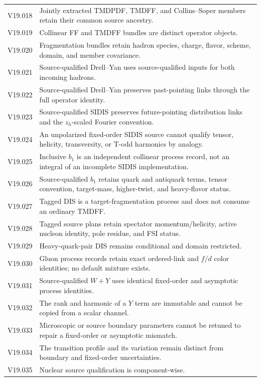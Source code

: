 \documentclass[11pt]{article}
\begin{document}
\begin{longtable}{L{0.12\textwidth}L{0.80\textwidth}}
V19.018 & Jointly extracted TMDPDF, TMDFF, and Collins--Soper members retain their common source ancestry.\\
V19.019 & Collinear FF and TMDFF bundles are distinct operator objects.\\
V19.020 & Fragmentation bundles retain hadron species, charge, flavor, scheme, domain, and member covariance.\\
V19.021 & Source-qualified Drell--Yan uses source-qualified inputs for both incoming hadrons.\\
V19.022 & Source-qualified Drell--Yan preserves past-pointing links through the full operator identity.\\
V19.023 & Source-qualified SIDIS preserves future-pointing distribution links and the \(z_h\)-scaled Fourier convention.\\
V19.024 & An unpolarized fixed-order SIDIS source cannot qualify tensor, helicity, transversity, or T-odd harmonics by analogy.\\
V19.025 & Inclusive \(b_1\) is an independent collinear process record, not an integral of an incomplete SIDIS implementation.\\
V19.026 & Source-qualified \(b_1\) retains quark and antiquark terms, tensor convention, target-mass, higher-twist, and heavy-flavor status.\\
V19.027 & Tagged DIS is a target-fragmentation process and does not consume an ordinary TMDFF.\\
V19.028 & Tagged source plans retain spectator momentum/helicity, active nucleon identity, pole residue, and FSI status.\\
V19.029 & Heavy-quark-pair DIS remains conditional and domain restricted.\\
V19.030 & Gluon process records retain exact ordered-link and \(f/d\) color identities; no default mixture exists.\\
V19.031 & Source-qualified \(W+Y\) uses identical fixed-order and asymptotic process identities.\\
V19.032 & The rank and harmonic of a \(Y\) term are immutable and cannot be copied from a scalar channel.\\
V19.033 & Microscopic or source boundary parameters cannot be retuned to repair a fixed-order or asymptotic mismatch.\\
V19.034 & The transition profile and its variation remain distinct from boundary and fixed-order uncertainties.\\
V19.035 & Nuclear source qualification is component-wise.\\

\end{longtable}
\end{document}
